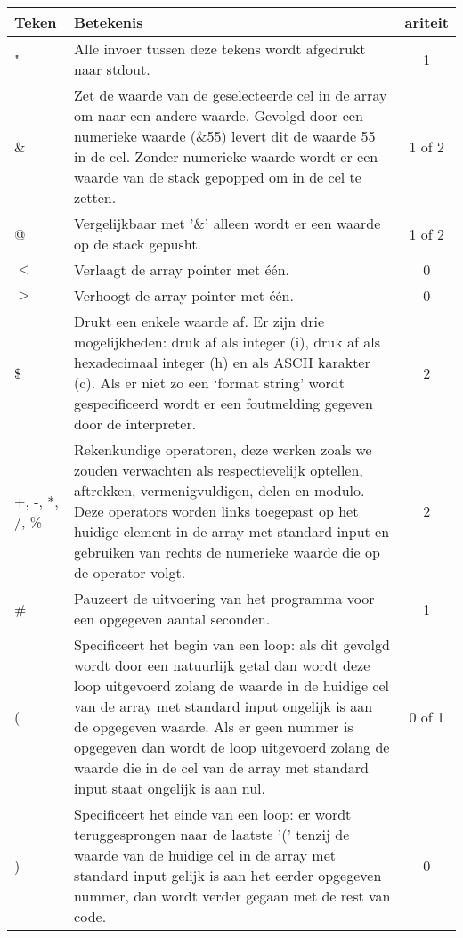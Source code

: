 \documentclass[11pt]{article}
\begin{document}
\begin{center}
    \begin{tabular}{ | l | p{14cm} | c |}
    \hline
    Teken & Betekenis & ariteit \\ \hline
    " & Alle invoer tussen deze tekens wordt afgedrukt naar stdout. & 1 \\ \hline
    \& & Zet de waarde van de geselecteerde cel in de array om naar een andere waarde. Gevolgd door een numerieke waarde (\&55) levert dit de waarde 55 in de cel. Zonder numerieke waarde wordt er een waarde van de stack gepopped om in de cel te zetten. & 1 of 2\\ \hline
    @ & Vergelijkbaar met '\&' alleen wordt er een waarde op de stack gepusht. & 1 of 2\\ \hline
    \(<\) & Verlaagt de array pointer met \'e\'en. & 0 \\ \hline
    \(>\) & Verhoogt de array pointer met \'e\'en. & 0 \\ \hline
    \$ & Drukt een enkele waarde af. Er zijn drie mogelijkheden: druk af als integer (i), druk af als hexadecimaal integer (h) en als ASCII karakter (c). Als er niet zo een `format string' wordt gespecificeerd wordt er een foutmelding gegeven door de interpreter. & 2 \\ \hline
    +, -, *, /, \% & Rekenkundige operatoren, deze werken zoals we zouden verwachten als respectievelijk optellen, aftrekken, vermenigvuldigen, delen en modulo. Deze operators worden links toegepast op het huidige element in de array met standard input en gebruiken van rechts de numerieke waarde die op de operator volgt. & 2\\ \hline
    \# & Pauzeert de uitvoering van het programma voor een opgegeven aantal seconden. & 1\\ \hline
    ( & Specificeert het begin van een loop: als dit gevolgd wordt door een natuurlijk getal dan wordt deze loop uitgevoerd zolang de waarde in de huidige cel van de array met standard input  ongelijk is aan de opgegeven waarde. Als er geen nummer is opgegeven dan wordt de loop uitgevoerd zolang de waarde die in de cel van de array met standard input staat ongelijk is aan nul. & 0 of 1 \\ \hline
    ) & Specificeert het einde van een loop: er wordt teruggesprongen naar de laatste '(' tenzij de waarde van de huidige cel in de array met standard input gelijk is aan het eerder opgegeven nummer, dan wordt verder gegaan met de rest van code. & 0 \\ \hline
  

    \hline
    \end{tabular}
\end{center}
\end{document}
